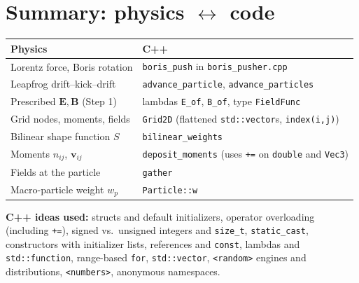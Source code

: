 \documentclass[11pt,a4paper]{article}
\newcommand{\vv}{\mathbf{v}}
\newcommand{\EE}{\mathbf{E}}
\newcommand{\BB}{\mathbf{B}}
\begin{document}
\section{Summary: physics $\leftrightarrow$ code}

\begin{center}
\begin{tabular}{p{5.2cm}p{8.6cm}}
\toprule
Physics & C++ \\
\midrule
Lorentz force, Boris rotation & \texttt{boris\_push} in \texttt{boris\_pusher.cpp}\\
Leapfrog drift--kick--drift & \texttt{advance\_particle}, \texttt{advance\_particles}\\
Prescribed $\EE,\BB$ (Step 1) & lambdas \texttt{E\_of}, \texttt{B\_of}, type \texttt{FieldFunc}\\
Grid nodes, moments, fields & \texttt{Grid2D} (flattened \texttt{std::vector}s, \texttt{index(i,j)})\\
Bilinear shape function $S$ & \texttt{bilinear\_weights}\\
Moments $n_{ij}$, $\vv_{ij}$ & \texttt{deposit\_moments} (uses \texttt{+=} on \texttt{double} and \texttt{Vec3})\\
Fields at the particle & \texttt{gather}\\
Macro-particle weight $w_p$ & \texttt{Particle::w}\\
\bottomrule
\end{tabular}
\end{center}

\noindent\textbf{C++ ideas used:} structs and default initializers, operator overloading (including
\texttt{+=}), signed vs.\ unsigned integers and \texttt{size\_t}, \texttt{static\_cast}, constructors with
initializer lists, references and \texttt{const}, lambdas and \texttt{std::function}, range-based
\texttt{for}, \texttt{std::vector}, \texttt{<random>} engines and distributions, \texttt{<numbers>},
anonymous namespaces.
\end{document}
